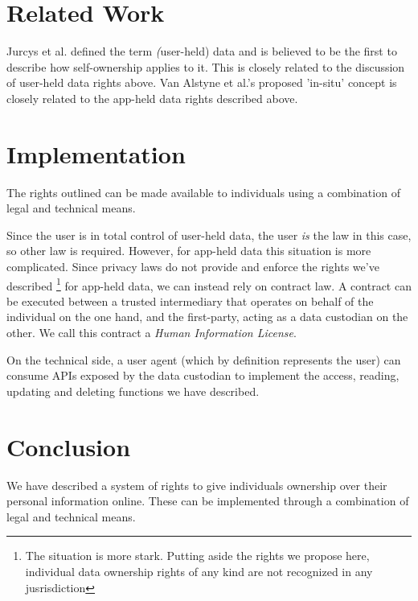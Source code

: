 \documentclass[11pt, oneside]{article}   	%
\begin{document}
\section{Related Work}

Jurcys et al.\cite{Jurcys2021} defined the term \emph(user-held) data and is believed to be the first to describe how self-ownership applies to it. This is closely related to the discussion of user-held data rights above. Van Alstyne et al.\cite{Alstyne2021}'s proposed 'in-situ' concept is closely related to the app-held data rights described above.

\section{Implementation}
The rights outlined can be made available to individuals using a combination of legal and technical means. 

Since the user is in total control of user-held data, the user \emph{is} the law in this case, so other law is required. However, for app-held data this situation is more complicated. Since privacy laws do not provide and enforce the rights we've described \footnote{The situation is more stark. Putting aside the rights we propose here, individual data ownership rights of any kind are not recognized in any jusrisdiction} for app-held data, we can instead rely on contract law. A contract can be executed between a trusted intermediary that operates on behalf of the individual on the one hand, and the first-party, acting as a data custodian on the other. We call this contract a \emph{Human Information License}. 

On the technical side, a user agent (which by definition represents the user) can consume APIs exposed by the data custodian to implement the access, reading, updating and deleting functions we have described. 

\section{Conclusion}
We have described a system of rights to give individuals ownership over their personal information online. These can be implemented through a combination of legal and technical means.



\end{document}

